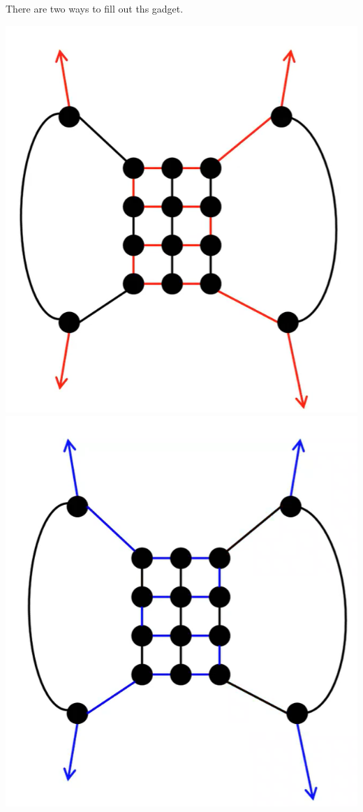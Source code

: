 \documentclass[letterpaper]{article}
\begin{document}
\begin{itemize}
\begin{center}
    \end{center}
    There are two ways to fill out ths gadget.
    \begin{center}
        \includegraphics[scale=0.30]{assets/zoe_ham_9.png}
        \includegraphics[scale=0.30]{assets/zoe_ham_10.png}

\end{center}
\end{itemize}
\end{document}
